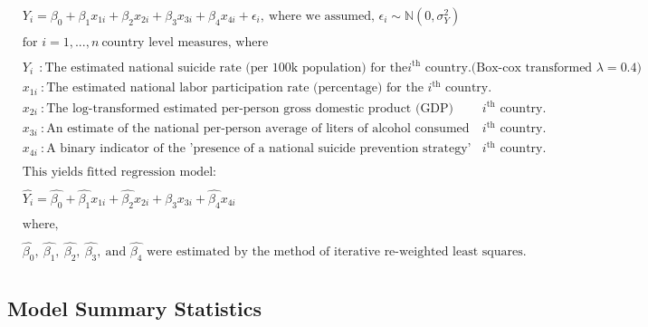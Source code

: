 \documentclass[]{article}
\begin{document}
\[
\begin{aligned}
& Y_i = \beta_0 + \beta_1 x_{1i} + \beta_2 x_{2i} + \beta_3 x_{3i} + \beta_4 x_{4i}  + \epsilon_i,\ \text{where we assumed, } \epsilon_i \sim \mathbb{N}(0,\sigma_{Y}^2) \\
&\\
&\text{for } i = 1,...,n \ \text{country level measures, where} \\
& \\
& Y_i \ \ : \text{The estimated national suicide rate (per 100k population) for the} i^{\text{th}} \text{ country.(Box-cox transformed $\lambda = 0.4$)} \\
& x_{1i}\ : \text{The estimated national labor participation rate (percentage) for the } i^{\text{th}} \text{ country.}\\
& x_{2i}\ : \text{The log-transformed estimated per-person gross domestic product (GDP) (income) for the } i^{\text{th}} \text{ country.}\\
& x_{3i}\ : \text{An estimate of the national per-person average of liters of alcohol consumed annually for the } i^{\text{th}} \text{ country.}\\
& x_{4i}\ : \text{A binary indicator of the 'presence of a national suicide prevention strategy' in 2019 for the } i^{\text{th}} \text{ country.}\\
& \\
& \text{This yields fitted regression model: } \\
& \\
& \hat{Y_i} = \hat{\beta_0} + \hat{\beta_1} x_{1i} + \hat{\beta_2} x_{2i} + \hat{\beta_3} x_{3i} + \hat{\beta_4} x_{4i} \\
& \\
& \text{where, } \\
& \\
& \hat{\beta_0},\ \hat{\beta_1},\ \hat{\beta_2},\ \hat{\beta_3}, \ \text{and } \hat{\beta_4} \text{ were estimated by the method of iterative re-weighted least squares.} \\
\end{aligned}
\]

\subsection{Model Summary Statistics}\label{model-summary-statistics}
\end{document}
